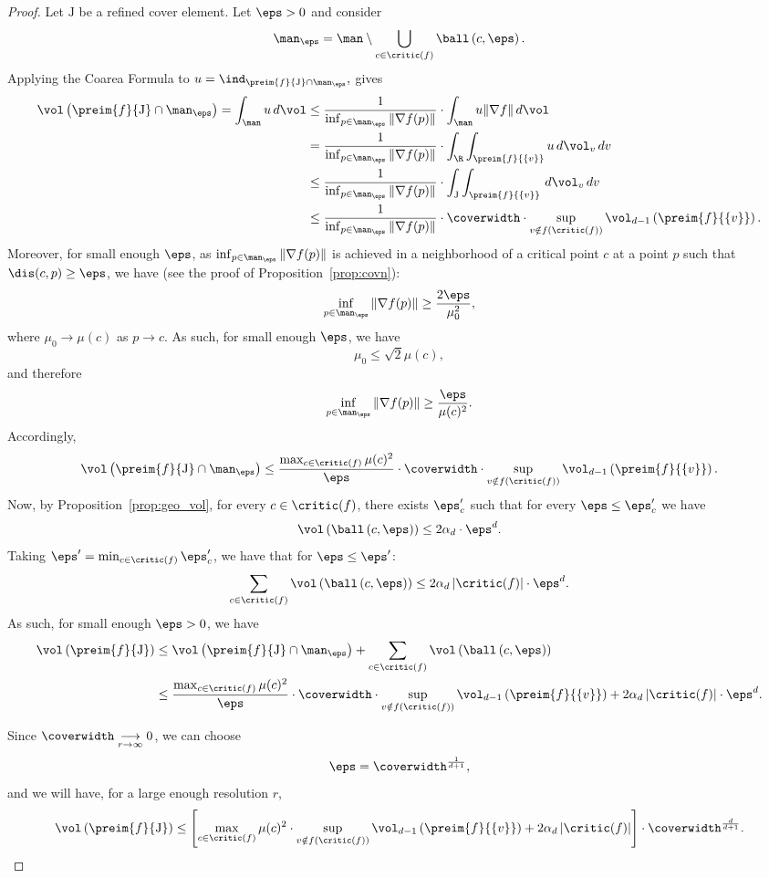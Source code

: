 \begin{proof}
Let $\mathrm{J}$ be a refined cover element. Let $\eps>0$ and consider $$\man_\eps=\man\setminus \bigcup_{c \in \critic(f)}\ball\left(c,\eps\right).$$
Applying the Coarea Formula to $u=\ind_{\preim{f}{\mathrm{J}}\cap\man_\eps},$ gives
\begin{align*}
\vol\left(\preim{f}{\mathrm{J}}\cap\man_\eps\right)=\int_\man u\,d\vol&\leq\frac{1}{\inf_{p\in\man_\eps}\Vert\nabla f(p)\Vert}\cdot \int_\man u\Vert\nabla f\Vert\,d\vol\\
&=\frac{1}{\inf_{p\in\man_\eps}\Vert\nabla f(p)\Vert}\cdot\int_{\R}\int_{\preim{f}{\{v\}}}u\,d\vol_v\,dv\\
&\leq\frac{1}{\inf_{p\in\man_\eps}\Vert\nabla f(p)\Vert}\cdot\int_{\mathrm{J}}\int_{\preim{f}{\{v\}}}\,d\vol_v\,dv\\
&\leq \frac{1}{\inf_{p\in\man_\eps}\Vert\nabla f(p)\Vert}\cdot\coverwidth\cdot\sup_{v\notin f(\critic(f))}\vol_{d-1}\left(\preim{f}{\{v\}}\right).
\end{align*}
Moreover, for small enough $\eps$, as $\inf_{p\in\man_\eps}\Vert\nabla f(p)\Vert$ is achieved in a neighborhood of a critical point $c$ at a point $p$ such that $\dis(c,p)\geq\eps$, we have (see the proof of Proposition~\ref{prop:covn}):
$$\inf_{p\in\man_\eps}\Vert\nabla f(p)\Vert \geq \frac{2\eps}{\mu_0^2},$$
where $\mu_0\rightarrow\mu(c)$ as $p\rightarrow c$. As such, for small enough $\eps$, we have
$$\mu_0\leq\sqrt{2}\mu(c),$$
and therefore
$$\inf_{p\in\man_\eps}\Vert\nabla f(p)\Vert \geq \frac{\eps}{\mu(c)^2}.$$
Accordingly,
$$\vol\left(\preim{f}{\mathrm{J}}\cap\man_\eps\right)\leq\frac{\max_{c\in\critic(f)}\mu(c)^2}{\eps}\cdot\coverwidth\cdot\sup_{v\notin f(\critic(f))}\vol_{d-1}\left(\preim{f}{\{v\}}\right).$$
Now, by Proposition~\ref{prop:geo_vol}, for every $c\in\critic(f)$, there exists $\eps'_c$ such that for every $\eps\leq\eps'_c$ we have
$$\vol\left(\ball\left(c,\eps\right)\right)\leq 2\alpha_d\cdot\eps^d.$$
Taking $\eps'=\min_{c\in\critic(f)}\eps'_c$, we have that for $\eps\leq\eps'$:
$$\sum_{c\in\critic(f)}\vol\left(\ball\left(c,\eps\right)\right)\leq 2\alpha_d\left|\critic(f)\right|\cdot\eps^d.$$
As such, for small enough $\eps>0$, we have
\begin{align*}
\vol\left(\preim{f}{\mathrm{J}}\right)&\leq\vol\left(\preim{f}{\mathrm{J}}\cap\man_\eps\right)+\sum_{c\in\critic(f)}\vol\left(\ball\left(c,\eps\right)\right)\\
&\leq\frac{\max_{c\in\critic(f)}\mu(c)^2}{\eps}\cdot\coverwidth\cdot\sup_{v\notin f(\critic(f))}\vol_{d-1}\left(\preim{f}{\{v\}}\right)+2\alpha_d\left|\critic(f)\right|\cdot\eps^d.
\end{align*}

Since $\coverwidth\underset{r\rightarrow\infty}{\longrightarrow}0$, we can choose $$\eps=\coverwidth^{\frac{1}{d+1}},$$
and we will have, for a large enough resolution $r$,
$$\vol\left(\preim{f}{\mathrm{J}}\right)\leq\left[\max_{c\in\critic(f)}\mu(c)^2\cdot\sup_{v\notin f(\critic(f))}\vol_{d-1}\left(\preim{f}{\{v\}}\right)+2\alpha_d\left|\critic(f)\right|\right]\cdot\coverwidth^{\frac{d}{d+1}}.$$
\end{proof}



